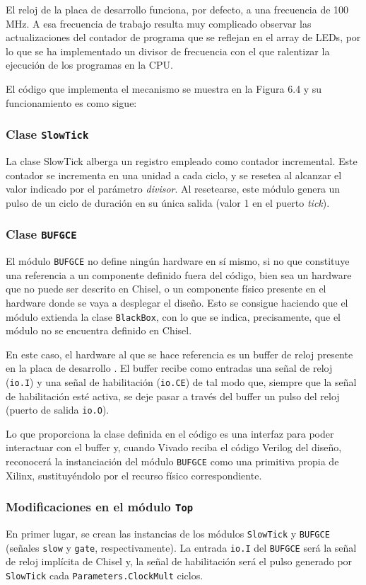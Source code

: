 El reloj de la placa de desarrollo funciona, por defecto, a una frecuencia de 100 MHz. A esa frecuencia de trabajo resulta muy complicado observar las actualizaciones del contador de programa que se reflejan en el array de LEDs, por lo que se ha implementado un divisor de frecuencia con el que ralentizar la ejecución de los programas en la CPU.

El código que implementa el mecanismo se muestra en la Figura 6.4 y su funcionamiento es como sigue:

\subsubsection{Clase \texttt{SlowTick}}
La clase SlowTick alberga un registro empleado como contador incremental. Este contador se incrementa en una unidad a cada ciclo, y se resetea al alcanzar el valor indicado por el parámetro \textit{divisor}. Al resetearse, este módulo genera un pulso de un ciclo de duración en su única salida (valor 1 en el puerto \textit{tick}).

\subsubsection{Clase \texttt{BUFGCE}}
El módulo \texttt{BUFGCE} no define ningún hardware en sí mismo, si no que constituye una referencia a un componente definido fuera del código, bien sea un hardware que no puede ser descrito en Chisel, o un componente físico presente en el hardware donde se vaya a desplegar el diseño. Esto se consigue haciendo que el módulo extienda la clase \texttt{BlackBox}, con lo que se indica, precisamente, que el módulo no se encuentra definido en Chisel.

En este caso, el hardware al que se hace referencia es un buffer de reloj presente en la placa de desarrollo \cite{bufgce-description}. El buffer recibe como entradas una señal de reloj (\texttt{io.I}) y una señal de habilitación (\texttt{io.CE}) de tal modo que, siempre que la señal de habilitación esté activa, se deje pasar a través del buffer un pulso del reloj (puerto de salida \texttt{io.O}).

Lo que proporciona la clase definida en el código es una interfaz para poder interactuar con el buffer y, cuando Vivado reciba el código Verilog del diseño, reconocerá la instanciación del módulo \texttt{BUFGCE} como una primitiva propia de Xilinx, sustituyéndolo por el recurso físico correspondiente.

\subsubsection{Modificaciones en el módulo \texttt{Top}}
En primer lugar, se crean las instancias de los módulos \texttt{SlowTick} y \texttt{BUFGCE} (señales \texttt{slow} y \texttt{gate}, respectivamente). La entrada \texttt{io.I} del \texttt{BUFGCE} será la señal de reloj implícita de Chisel y, la señal de habilitación será el pulso generado por \texttt{SlowTick} cada \texttt{Parameters.ClockMult} ciclos.

